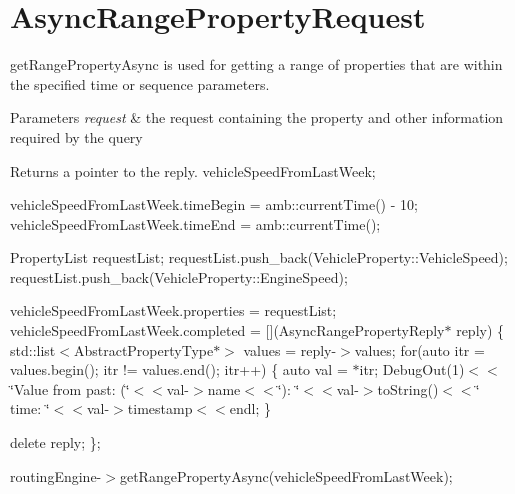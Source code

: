\hypertarget{AsyncRangePropertyRequest-example}{\section{Async\-Range\-Property\-Request}
}
get\-Range\-Property\-Async is used for getting a range of properties that are within the specified time or sequence parameters. 
\begin{DoxyParams}{Parameters}
{\em request} & the request containing the property and other information required by the query \\
\hline
\end{DoxyParams}
\begin{DoxyReturn}{Returns}
a pointer to the reply. vehicle\-Speed\-From\-Last\-Week;
\end{DoxyReturn}
vehicle\-Speed\-From\-Last\-Week.\-time\-Begin = amb\-::current\-Time() -\/ 10; vehicle\-Speed\-From\-Last\-Week.\-time\-End = amb\-::current\-Time();

Property\-List request\-List; request\-List.\-push\-\_\-back(\-Vehicle\-Property\-::\-Vehicle\-Speed); request\-List.\-push\-\_\-back(\-Vehicle\-Property\-::\-Engine\-Speed);

vehicle\-Speed\-From\-Last\-Week.\-properties = request\-List; vehicle\-Speed\-From\-Last\-Week.\-completed = \mbox{[}\mbox{]}(Async\-Range\-Property\-Reply$\ast$ reply) \{ std\-::list$<$\-Abstract\-Property\-Type$\ast$$>$ values = reply-\/$>$values; for(auto itr = values.\-begin(); itr != values.\-end(); itr++) \{ auto val = $\ast$itr; Debug\-Out(1)$<$$<$\char`\"{}\-Value from past\-: (\char`\"{}$<$$<$val-\/$>$name$<$$<$\char`\"{})\-: \char`\"{}$<$$<$val-\/$>$to\-String()$<$$<$\char`\"{} time\-: \char`\"{}$<$$<$val-\/$>$timestamp$<$$<$endl; \}

delete reply; \};

routing\-Engine-\/$>$get\-Range\-Property\-Async(vehicle\-Speed\-From\-Last\-Week);


\begin{DoxyCodeInclude}
\end{DoxyCodeInclude}
 